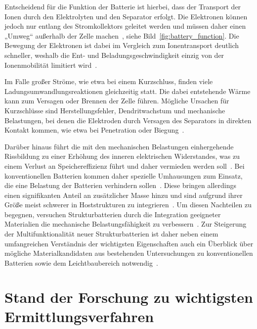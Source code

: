 Entscheidend für die Funktion der Batterie ist hierbei, dass der Transport der Ionen durch den Elektrolyten und den Separator erfolgt. Die Elektronen können jedoch nur entlang des Stromkollektors geleitet werden und müssen daher einen „Umweg“ außerhalb der Zelle machen~\cite{Plett2015}, siehe Bild~\ref{fig:battery_function}. Die Bewegung der Elektronen ist dabei im Vergleich zum Ionentransport deutlich schneller, weshalb die Ent- und Beladungsgeschwindigkeit einzig von der Ionenmobilität limitiert wird~\cite{Plett2024}.

Im Falle großer Ströme, wie etwa bei einem Kurzschluss, finden viele Ladungsumwandlungsreaktionen gleichzeitig statt. Die dabei entstehende Wärme kann zum Versagen oder Brennen der Zelle führen. Mögliche Ursachen für Kurzschlüsse sind Herstellungsfehler, Dendritwachstum und mechanische Belastungen, bei denen die Elektroden durch Versagen des Separators in direkten Kontakt kommen, wie etwa bei Penetration oder Biegung~\cite{Beard2019}.

Darüber hinaus führt die mit den mechanischen Belastungen einhergehende Rissbildung zu einer Erhöhung des inneren elektrischen Widerstandes, was zu einem Verlust an Speichereffizienz führt und daher vermieden werden soll~\cite{Plett2024}. Bei konventionellen Batterien kommen daher spezielle Umhausungen zum Einsatz, die eine Belastung der Batterien verhindern sollen~\cite{Beard2019}. Diese bringen allerdings einen signifikanten Anteil an zusätzlicher Masse hinzu und sind aufgrund ihrer Größe meist schwerer in Hoststrukturen zu integrieren~\cite{Asp2021}. Um diesen Nachteilen zu begegnen, versuchen Strukturbatterien durch die Integration geeigneter Materialien die mechanische Belastungsfähigkeit zu verbessern~\cite{Carlstedt2018}. Zur Steigerung der Multifunktionalität neuer Strukturbatterien ist daher neben einem umfangreichen Verständnis der wichtigsten Eigenschaften auch ein Überblick über mögliche Materialkandidaten aus bestehenden Untersuchungen zu konventionellen Batterien sowie dem Leichtbaubereich notwendig~\cite{Asp2019}.


\section{\label{sec:Ermittlungsverfahren}Stand der Forschung zu wichtigsten Ermittlungsverfahren}

